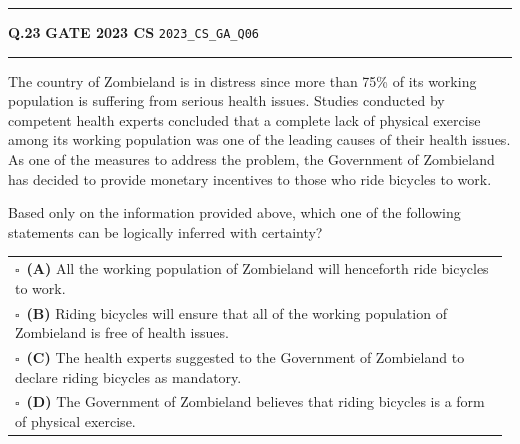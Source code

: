 \documentclass[a4paper,10pt]{article}
\begin{document}
\vspace{6pt}\hrule height 0.35pt\vspace{6pt}
\noindent
\begin{tcolorbox}[
    blanker,
    sidebyside,
    sidebyside align=top,
    lefthand width=0.55\textwidth,
    top=4pt, bottom=4pt, left=0pt, right=0pt,
    middle=16pt,
    underlay={
        \draw[dashed, black!80, line width=0.8pt, dash pattern=on 4pt off 3pt]
            ([xshift=0.55\textwidth+8pt]frame.north west) --
            ([xshift=0.55\textwidth+8pt]frame.south west);
    }
]
\textbf{Q.23}  \hfill {\footnotesize\textbf{GATE 2023 CS} \quad \tiny\texttt{2023\_CS\_GA\_Q06}}
\vspace{2pt}\hrule height 0.3pt\vspace{4pt}

The country of Zombieland is in distress since more than 75\% of its working population is suffering from serious health issues. Studies conducted by competent health experts concluded that a complete lack of physical exercise among its working population was one of the leading causes of their health issues. As one of the measures to address the problem, the Government of Zombieland has decided to provide monetary incentives to those who ride bicycles to work.
\par\medskip
Based only on the information provided above, which one of the following statements can be logically inferred with certainty?

\par\vspace{6pt}\noindent
\begin{tabular}{@{}p{0.98\linewidth}@{}}
$\square$\ \textbf{(A)} All the working population of Zombieland will henceforth ride bicycles to work. \\
\addlinespace[3pt]
$\square$\ \textbf{(B)} Riding bicycles will ensure that all of the working population of Zombieland is free of health issues. \\
\addlinespace[3pt]
$\square$\ \textbf{(C)} The health experts suggested to the Government of Zombieland to declare riding bicycles as mandatory. \\
\addlinespace[3pt]
$\square$\ \textbf{(D)} The Government of Zombieland believes that riding bicycles is a form of physical exercise.
\end{tabular}

\tcblower


\end{tcolorbox}
\end{document}
